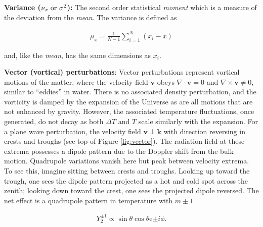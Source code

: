 \documentclass[a4paper,10pt]{article}
\begin{document}
{\noindent}\textbf{Variance ($\nu_x~{\rm or}~\sigma^2$):} The second order statistical \textit{moment} which is a measure of the deviation from the \textit{mean}. The variance is defined as

\begin{align*}
    \mu_x = \frac{1}{N-1} \sum_{i=1}^N (x_i-\bar{x})
\end{align*}

{\noindent}and, like the \textit{mean}, has the same dimensions as $x_i$.

{\noindent}\textbf{Vector (vortical) perturbations}: Vector perturbations represent vortical motions of the matter, where the velocity field $\bm{v}$ obeys $\nabla\cdot\bm{v}=0$ and $\nabla\times\bm{v}\neq0$, similar to ``eddies'' in water. There is no associated density perturbation, and the vorticity is damped by the expansion of the Universe as are all motions that are not enhanced by gravity. However, the associated temperature fluctuations, once generated, do not decay as both $\Delta T$ and $T$ scale similarly with the expansion. For a plane wave perturbation, the velocity field $\bm{v}\perp\bm{k}$ with direction reversing in crests and troughs (see top of Figure \ref{fig:vector}). The radiation field at these extrema possesses a dipole pattern due to the Doppler shift from the bulk motion. Quadrupole variations vanish here but peak between velocity extrema. To see this, imagine sitting between crests and troughs. Looking up toward the trough, one sees the dipole pattern projected as a hot and cold spot across the zenith; looking down toward the crest, one sees the projected dipole reversed. The net effect is a quadrupole pattern in temperature with $m\pm1$

\begin{align*}
    Y_2^{\pm1}\propto\sin\theta\cos\theta\mathrm{e}{\pm i\phi}.
\end{align*}
\end{document}
